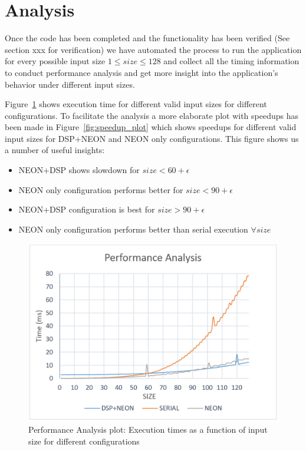 \newpage
\section{Analysis}

Once the code has been completed and the functionality has been verified (See section xxx for verification) we have automated the process to run the application for every possible input size $1 \leq size \leq 128$ and collect all the timing information to conduct performance analysis and get more insight into the application's behavior under different input sizes.

Figure~\ref{fig:perf_plot} shows execution time for different valid input sizes for different configurations. To facilitate the analysis a more elaborate plot with speedups has been made in Figure~\ref{fig:speedup_plot} which shows speedups for different valid input sizes for DSP+NEON and NEON only configurations. This figure shows us a number of useful insights:
\begin{itemize}
\item{NEON+DSP shows slowdown for $size < 60 + \epsilon$}
\item{NEON only configuration performs better for $size < 90 + \epsilon$}
\item{NEON+DSP configuration is best for $size >90 + \epsilon$}
\item{NEON only configuration performs better than serial execution $ \forall size$}

\end{itemize}



\begin{figure}[h!]
\includegraphics[width=\textwidth]{analysis/perf_plot}
\caption{Performance Analysis plot: Execution times as a function of input size for different configurations}
\label{fig:perf_plot}
\end{figure}


